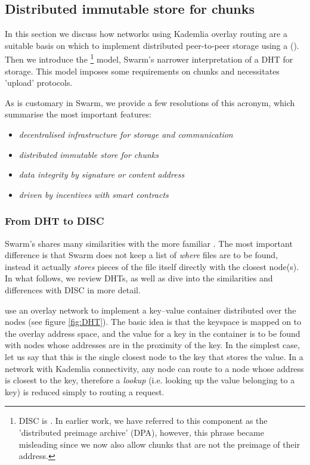\subsection{Distributed immutable store for chunks\statusgreen}\label{sec:disc}
 
In this section we discuss how networks using Kademlia overlay routing are a suitable basis on which to implement distributed peer-to-peer storage using a  (). Then we introduce the %
%
\footnote{DISC is . In earlier work, we have referred to this component as the 'distributed preimage archive' (DPA), however, this phrase became misleading since we now also allow chunks that are not the preimage of their address.}
% 
model, Swarm's narrower interpretation of a DHT for storage. This model 
imposes some requirements on chunks and necessitates 'upload' protocols. 

As is customary in Swarm, we provide a few resolutions of this acronym, which summarise the most important features:


\begin{itemize}
\item \emph{decentralised infrastructure for storage and communication} 
\item \emph{distributed immutable store for chunks} 
\item \emph{data integrity by signature or content address}
\item \emph{driven by incentives with smart contracts} 

\end{itemize}
 
\subsubsection{From DHT to DISC}
Swarm's  shares many similarities with the more familiar . The most important difference is that Swarm does not keep a list of \emph{where} files are to be found, instead it actually \emph{stores} pieces of the file itself directly with the closest node(s). 
In what follows, we review DHTs, as well as dive into the similarities and differences with DISC in more detail. 
 
 use an overlay network to implement a key--value container distributed over the nodes (see figure \ref{fig:DHT}). The basic idea is that the keyspace is mapped on to the overlay address space, and the value for a key in the container is to be found with nodes whose addresses are in the proximity of the key. In the simplest case, let us say that this is the single closest node to the key that stores the value. In a network with Kademlia connectivity, any node can route to a node whose address is closest to the key, therefore a \emph{lookup} (i.e. looking up the value belonging to a key) is reduced simply to routing a request. 

